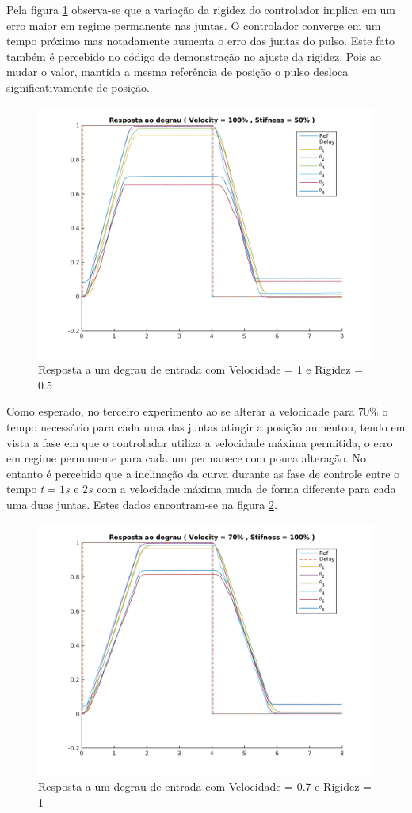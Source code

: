 Pela figura \ref{fig:jointIdentification_exp2v100v50} observa-se que a variação da rigidez do controlador implica em um erro maior em regime permanente nas juntas. O controlador converge em um tempo próximo mas notadamente aumenta o erro das juntas do pulso. Este fato também é percebido no código de demonstração no ajuste da rigidez. Pois ao mudar o valor, mantida a mesma referência de posição o pulso desloca significativamente de posição.

\begin{figure}[H]
    \centering
    \includegraphics[width=0.6\linewidth]{tex/figs/jointIdentification_exp2v100v50.png}
    \caption{Resposta a um degrau de entrada com Velocidade = 1 e Rigidez = 0.5}
    \label{fig:jointIdentification_exp2v100v50}
\end{figure}

Como esperado, no terceiro experimento ao se alterar a velocidade para $70\%$ o tempo necessário para cada uma das juntas atingir a posição aumentou, tendo em vista a fase em que o controlador utiliza a velocidade máxima permitida, o erro em regime permanente para cada um permanece com pouca alteração. No entanto é percebido que a inclinação da curva durante as fase de controle entre o tempo $t=1s$ e $2s$ com a velocidade máxima muda de forma diferente para cada uma duas juntas. Estes dados encontram-se na figura \ref{fig:jointIdentification_exp3v70v100}.

\begin{figure}[H]
    \centering
    \includegraphics[width=0.6\linewidth]{tex/figs/jointIdentification_exp3v70v100.png}
    \caption{Resposta a um degrau de entrada com Velocidade = 0.7 e Rigidez = 1}
    \label{fig:jointIdentification_exp3v70v100}
\end{figure}

